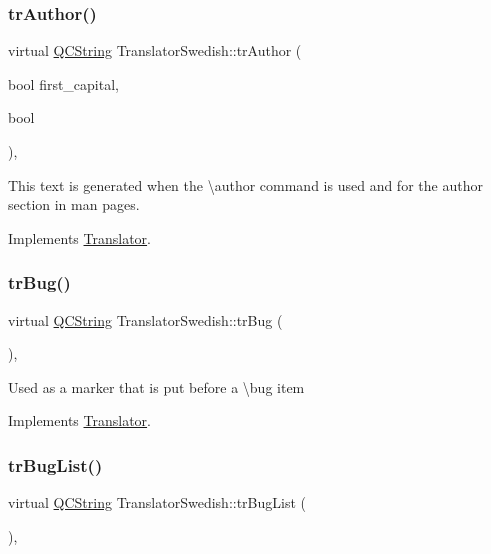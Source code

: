\subsubsection{\texorpdfstring{trAuthor()}{trAuthor()}}
{\footnotesize\ttfamily virtual \mbox{\hyperlink{class_q_c_string}{Q\+C\+String}} Translator\+Swedish\+::tr\+Author (\begin{DoxyParamCaption}\item[{bool}]{first\+\_\+capital,  }\item[{bool}]{ }\end{DoxyParamCaption})\hspace{0.3cm}{\ttfamily [inline]}, {\ttfamily [virtual]}}

This text is generated when the \textbackslash{}author command is used and for the author section in man pages. 

Implements \mbox{\hyperlink{class_translator}{Translator}}.

\mbox{\label{class_translator_swedish_abea4c0d3b2c6a55ae768266a2aad7aaf}} 
\subsubsection{\texorpdfstring{trBug()}{trBug()}}
{\footnotesize\ttfamily virtual \mbox{\hyperlink{class_q_c_string}{Q\+C\+String}} Translator\+Swedish\+::tr\+Bug (\begin{DoxyParamCaption}{ }\end{DoxyParamCaption})\hspace{0.3cm}{\ttfamily [inline]}, {\ttfamily [virtual]}}

Used as a marker that is put before a \textbackslash{}bug item 

Implements \mbox{\hyperlink{class_translator}{Translator}}.

\mbox{\label{class_translator_swedish_afaf2bfd68724f9c692da8050162bdef6}} 
\subsubsection{\texorpdfstring{trBugList()}{trBugList()}}
{\footnotesize\ttfamily virtual \mbox{\hyperlink{class_q_c_string}{Q\+C\+String}} Translator\+Swedish\+::tr\+Bug\+List (\begin{DoxyParamCaption}{ }\end{DoxyParamCaption})\hspace{0.3cm}{\ttfamily [inline]}, {\ttfamily [virtual]}}

